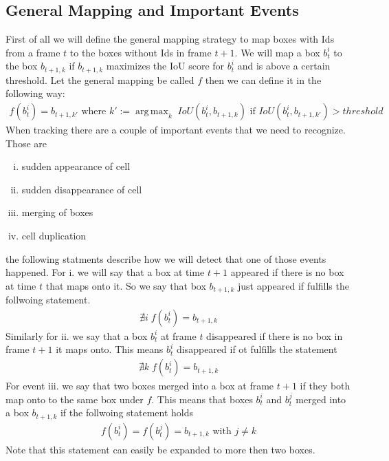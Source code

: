 \documentclass{article}
\DeclareMathOperator*{\argmax}{arg\,max}
\begin{document}
\subsection[short]{General Mapping and Important Events}
First of all we will define the general mapping strategy to map boxes with Ids from a frame $t$ to the boxes without Ids in frame $t+1$. We will map a box $b_{t}^i$
to the box $b_{t+1, k}$ if $b_{t+1, k}$ maximizes the IoU score for $b_{t}^i$ and is above a certain threshold. Let the general mapping be called $f$ then we can
define it in the following way:
\begin{align}
    f \left(b_{t}^i \right) = b_{t+1, k'} \text{ where } k' := \argmax_k \; IoU \left(b_{t}^i, b_{t+1, k}\right) \text{ if } IoU \left(b_{t}^i, b_{t+1, k'}\right) > threshold  
\end{align}   
When tracking there are a couple of important events that we need to recognize. Those are
\begin{enumerate}[i.]
    \item sudden appearance of cell
    \item sudden disappearance of cell
    \item merging of boxes
    \item cell duplication 
\end{enumerate}
the following statments describe how we will detect that one of those events happened. For i. we will say that a box at time $t+1$ appeared if there is no box at time
$t$ that maps onto it. So we say that box $b_{t+1, k}$ just appeared if fulfills the follwoing statement.
\begin{align}
    \nexists i \; f\left(b_{t}^i\right) = b_{t+1, k}
\end{align}
Similarly for ii. we say that a box $b_{t}^i$ at frame $t$ disappeared if there is no box in frame $t+1$ it maps onto. This means $b_{t}^i$ disappeared if ot fulfills
the statement
\begin{align}
    \nexists k \; f\left(b_{t}^i\right) = b_{t+1, k}
\end{align}
For event iii. we say that two boxes merged into a box at frame $t+1$ if they both map onto to the same box under $f$. This means that boxes $b_{t}^i$ and $b_{t}^j$
merged into a box $b_{t+1, k}$ if the follwoing statement holds
\begin{align}
    f\left(b_{t}^i\right) = f\left(b_{t}^j\right) = b_{t+1, k} \text{ with } j \neq k
\end{align}
Note that this statement can easily be expanded to more then two boxes.\\
\end{document}
